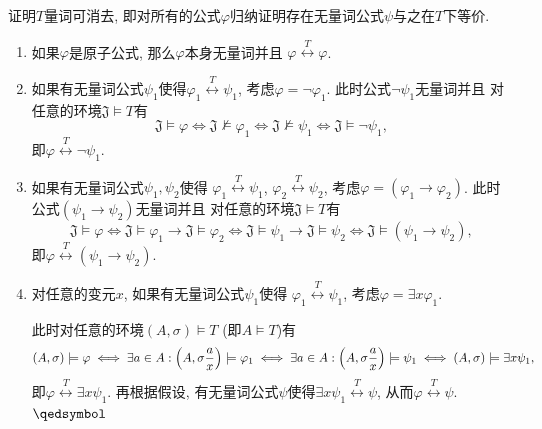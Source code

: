 \documentclass[UTF8]{ctexart}
\begin{document}

证明$T$量词可消去, 即对所有的公式$\varphi$归纳证明存在无量词公式$\psi$与之在$T$下等价.

\begin{enumerate}
    \item 如果$\varphi$是原子公式, 那么$\varphi$本身无量词并且
    $\varphi\overset{T}{\leftrightarrow}\varphi$.

    \item 如果有无量词公式$\psi_1$使得$\varphi_1\overset{T}{\leftrightarrow}\psi_1$,
    考虑$\varphi=\neg\varphi_1$. 此时公式$\neg\psi_1$无量词并且
    对任意的环境$\mathfrak{J}\models T$有
    \[
        \mathfrak{J}\models\varphi\iff\mathfrak{J}\not\models\varphi_1\iff
        \mathfrak{J}\not\models\psi_1\iff\mathfrak{J}\models\neg\psi_1,
    \]
    即$\varphi\overset{T}{\leftrightarrow}\neg\psi_1$.

    \item 如果有无量词公式$\psi_1,\psi_2$使得
    $\varphi_1\overset{T}{\leftrightarrow}\psi_1$,
    $\varphi_2\overset{T}{\leftrightarrow}\psi_2$,
    考虑$\varphi=(\varphi_1\to\varphi_2)$. 此时公式$(\psi_1\to\psi_2)$无量词并且
    对任意的环境$\mathfrak{J}\models T$有
    \[
        \mathfrak{J}\models\varphi\iff
        \mathfrak{J}\models\varphi_1\to\mathfrak{J}\models\varphi_2\iff
        \mathfrak{J}\models\psi_1\to\mathfrak{J}\models\psi_2\iff
        \mathfrak{J}\models(\psi_1\to\psi_2),
    \]
    即$\varphi\overset{T}{\leftrightarrow}(\psi_1\to\psi_2)$.

    \item 对任意的变元$x$, 如果有无量词公式$\psi_1$使得
    $\varphi_1\overset{T}{\leftrightarrow}\psi_1$, 考虑$\varphi=\exists x\varphi_1$.

    \hspace{2.17em}
    此时对任意的环境$(A,\sigma)\models T$ (即$A\models T$)有
    \vspace{3pt}
    \[
        (A,\sigma)\models\varphi\iff
        \exists a\in A:\left(A,\sigma\frac{a}{x}\right)\models\varphi_1\iff
        \exists a\in A:\left(A,\sigma\frac{a}{x}\right)\models\psi_1\iff
        (A,\sigma)\models\exists x\psi_1,\\[3pt]
    \]
    即$\varphi\overset{T}{\leftrightarrow}\exists x\psi_1$. 再根据假设,
    有无量词公式$\psi$使得$\exists x\psi_1\overset{T}{\leftrightarrow}\psi$,
    从而$\varphi\overset{T}{\leftrightarrow}\psi$. \hfill $\qedsymbol$
\end{enumerate}
\end{document}
